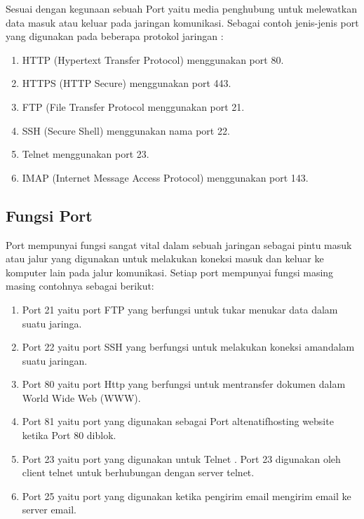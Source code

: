 \documentclass[12pt,a4paper]{article}
\begin{document}
\hspace{1cm}
Sesuai dengan kegunaan sebuah Port yaitu media penghubung untuk melewatkan data masuk atau keluar pada jaringan komunikasi. Sebagai contoh jenis-jenis port yang digunakan pada beberapa protokol jaringan :\\
\begin{enumerate}
\item HTTP (Hypertext Transfer Protocol) menggunakan port 80.
\item HTTPS (HTTP Secure) menggunakan port 443.
\item FTP (File Transfer Protocol menggunakan port 21.
\item SSH (Secure Shell) menggunakan nama port 22.
\item Telnet menggunakan port 23.
\item IMAP (Internet Message Access Protocol) menggunakan port 143.
\end{enumerate}

\subsection{Fungsi Port}
\hspace{1cm}
Port mempunyai fungsi sangat vital dalam sebuah jaringan sebagai pintu masuk atau jalur yang digunakan untuk melakukan koneksi masuk dan keluar ke komputer lain pada jalur komunikasi. Setiap port mempunyai fungsi masing masing contohnya sebagai berikut:
\begin{enumerate}
\item Port 21 yaitu port FTP yang berfungsi untuk tukar menukar data dalam suatu jaringa.
\item Port 22 yaitu port SSH yang berfungsi untuk  melakukan koneksi amandalam suatu jaringan.
\item Port 80 yaitu port Http yang berfungsi untuk mentransfer dokumen dalam World Wide Web (WWW).
\item Port 81 yaitu port yang digunakan sebagai Port altenatifhosting website ketika Port 80 diblok.
\item Port 23 yaitu port yang digunakan untuk Telnet . Port 23 digunakan oleh client telnet untuk berhubungan dengan server telnet.
\item Port 25 yaitu port yang digunakan ketika pengirim email  mengirim email ke server email.

\end{enumerate}
\end{document}
